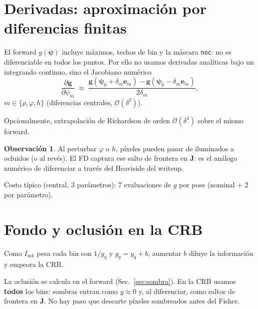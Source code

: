 \documentclass[11pt,a4paper]{article}
\theoremstyle{definition}
\newtheorem{remark}{Observaci\'on}
\newcommand{\vect}[1]{\boldsymbol{#1}}
\newcommand{\matr}[1]{\mathbf{#1}}
\begin{document}
\section{Derivadas: aproximaci\'on por diferencias finitas}
\label{sec:fd}

El forward $g(\vect{\psi})$ incluye m\'aximos, techos de bin y la m\'ascara
\texttt{noc}: no es diferenciable en todos los puntos.
Por ello no usamos derivadas anal\'iticas bajo un integrando continuo, sino
el Jacobiano num\'erico
\begin{equation}
    \frac{\partial\vect{g}}{\partial\psi_m}
    \;\approx\;
    \frac{
        \vect{g}(\vect{\psi}_0+\delta_m\vect{e}_m)
        -
        \vect{g}(\vect{\psi}_0-\delta_m\vect{e}_m)
    }{2\delta_m},
    \label{eq:central}
\end{equation}
$m\in\{\rho,\varphi,h\}$ (diferencias centrales, $\mathcal{O}(\delta^{2})$).

Opcionalmente, extrapolaci\'on de Richardson de orden $\mathcal{O}(\delta^{4})$
sobre el mismo forward.

\begin{remark}
Al perturbar $\varphi$ o $h$, p\'ixeles pueden pasar de iluminados a ocluidos
(o al rev\'es). El FD captura ese salto de frontera en $\matr{J}$: es el
an\'alogo num\'erico de diferenciar a trav\'es del Heaviside del writeup.
\end{remark}

Costo t\'ipico (central, $3$ par\'ametros): $7$ evaluaciones de $g$ por pose
(nominal + $2$ por par\'ametro).

\section{Fondo y oclusi\'on en la CRB}
\label{sec:fondo}

Como $I_{mk}$ pesa cada bin con $1/g_q$ y $g_q=y_q+b$, aumentar $b$ diluye la
informaci\'on y empeora la CRB.

La oclusi\'on se calcula en el forward (Sec.~\ref{sec:sombra}). En la CRB
usamos \textbf{todos} los bins: sombras entran como $y\approx 0$ y, al
diferenciar, como saltos de frontera en $\matr{J}$. No hay paso que descarte
p\'ixeles sombreados antes del Fisher.
\end{document}
